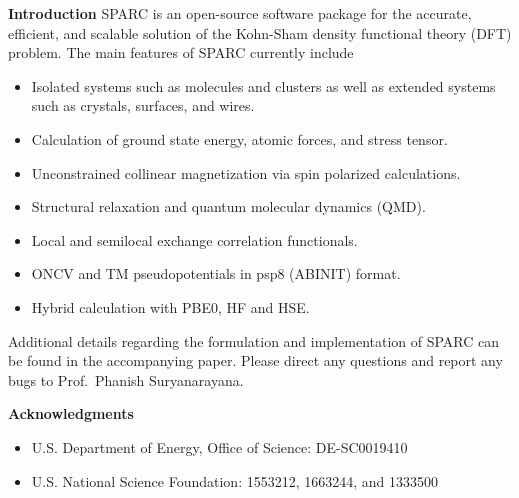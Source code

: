 \begin{frame}[allowframebreaks]{\textbf{Introduction}} \label{Introduction}
SPARC is an open-source software package for the accurate, efficient, and scalable solution of the Kohn-Sham density functional theory (DFT) problem. The main features of SPARC currently include
\begin{itemize}
  \item Isolated systems such as molecules and clusters as well as extended systems such as crystals, surfaces, and wires. 
  \item Calculation of ground state energy, atomic forces, and stress tensor.
  \item Unconstrained collinear magnetization via spin polarized calculations.
  \item Structural relaxation and quantum molecular dynamics (QMD). 
  \item Local and semilocal exchange correlation functionals. 
  \item ONCV and TM pseudopotentials in psp8 (ABINIT) format. 
  \item Hybrid calculation with PBE0, HF and HSE.
\end{itemize}
Additional details regarding the formulation and implementation of SPARC can be found in the accompanying paper. Please direct any questions and report any bugs to Prof.~Phanish Suryanarayana.

\end{frame}


\begin{frame}[allowframebreaks]{\textbf{Acknowledgments}} \label{Acknowledgments}

\begin{itemize}
    \item U.S. Department of Energy, Office of Science: DE-SC0019410
    \item U.S. National Science Foundation: 1553212, 1663244, and 1333500
\end{itemize}

\end{frame}



